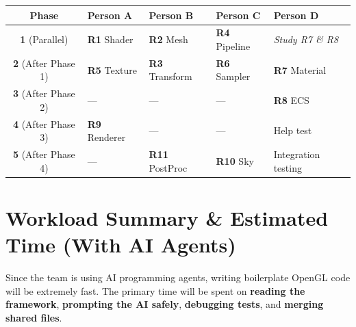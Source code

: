 \documentclass[12pt,a4paper]{article}
\begin{document}
\begin{center}
\renewcommand{\arraystretch}{1.4}
\begin{tabular}{c >{\centering\arraybackslash}p{3cm} >{\centering\arraybackslash}p{3cm} >{\centering\arraybackslash}p{3cm} >{\centering\arraybackslash}p{3cm}}
\toprule
\textbf{Phase} & \textcolor{personA}{\textbf{Person A}} & \textcolor{personB}{\textbf{Person B}} & \textcolor{personC}{\textbf{Person C}} & \textcolor{personD}{\textbf{Person D}} \\
\midrule
\textbf{1} (Parallel) &
  \textbf{R1} Shader &
  \textbf{R2} Mesh &
  \textbf{R4} Pipeline &
  \emph{Study R7 \& R8} \\
\midrule
\textbf{2} (After Phase 1) &
  \textbf{R5} Texture &
  \textbf{R3} Transform &
  \textbf{R6} Sampler &
  \textbf{R7} Material \\
\midrule
\textbf{3} (After Phase 2) &
  --- &
  --- &
  --- &
  \textbf{R8} ECS \\
\midrule
\textbf{4} (After Phase 3) &
  \textbf{R9} Renderer &
  --- &
  --- &
  Help test \\
\midrule
\textbf{5} (After Phase 4) &
  --- &
  \textbf{R11} PostProc &
  \textbf{R10} Sky &
  Integration testing \\
\bottomrule
\end{tabular}
\end{center}

\section{Workload Summary \& Estimated Time (With AI Agents)}

Since the team is using AI programming agents, writing boilerplate OpenGL code will be extremely fast. The primary time will be spent on \textbf{reading the framework}, \textbf{prompting the AI safely}, \textbf{debugging tests}, and \textbf{merging shared files}.
\end{document}
